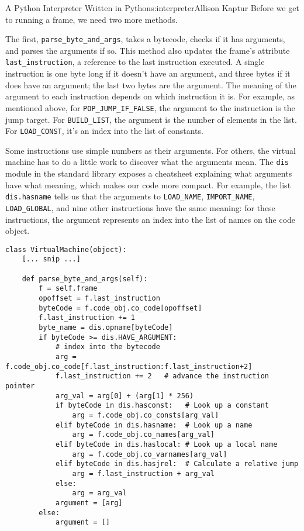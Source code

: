 \begin{aosachapter}{A Python Interpreter Written in Python}{s:interpreter}{Allison Kaptur}
Before we get to running a frame, we need two more methods.

The first, \texttt{parse\_byte\_and\_args}, takes a bytecode, checks if
it has arguments, and parses the arguments if so. This method also
updates the frame's attribute \texttt{last\_instruction}, a reference to
the last instruction executed. A single instruction is one byte long if
it doesn't have an argument, and three bytes if it does have an
argument; the last two bytes are the argument. The meaning of the
argument to each instruction depends on which instruction it is. For
example, as mentioned above, for \texttt{POP\_JUMP\_IF\_FALSE}, the
argument to the instruction is the jump target. For
\texttt{BUILD\_LIST}, the argument is the number of elements in the
list. For \texttt{LOAD\_CONST}, it's an index into the list of
constants.

Some instructions use simple numbers as their arguments. For others, the
virtual machine has to do a little work to discover what the arguments
mean. The \texttt{dis} module in the standard library exposes a
cheatsheet explaining what arguments have what meaning, which makes our
code more compact. For example, the list \texttt{dis.hasname} tells us
that the arguments to \texttt{LOAD\_NAME}, \texttt{IMPORT\_NAME},
\texttt{LOAD\_GLOBAL}, and nine other instructions have the same
meaning: for these instructions, the argument represents an index into
the list of names on the code object.

\begin{verbatim}
class VirtualMachine(object):
    [... snip ...]

    def parse_byte_and_args(self):
        f = self.frame
        opoffset = f.last_instruction
        byteCode = f.code_obj.co_code[opoffset]
        f.last_instruction += 1
        byte_name = dis.opname[byteCode]
        if byteCode >= dis.HAVE_ARGUMENT:
            # index into the bytecode
            arg = f.code_obj.co_code[f.last_instruction:f.last_instruction+2]  
            f.last_instruction += 2   # advance the instruction pointer
            arg_val = arg[0] + (arg[1] * 256)
            if byteCode in dis.hasconst:   # Look up a constant
                arg = f.code_obj.co_consts[arg_val]
            elif byteCode in dis.hasname:  # Look up a name
                arg = f.code_obj.co_names[arg_val]
            elif byteCode in dis.haslocal: # Look up a local name
                arg = f.code_obj.co_varnames[arg_val]
            elif byteCode in dis.hasjrel:  # Calculate a relative jump
                arg = f.last_instruction + arg_val
            else:
                arg = arg_val
            argument = [arg]
        else:
            argument = []


\end{verbatim}
\end{aosachapter}
